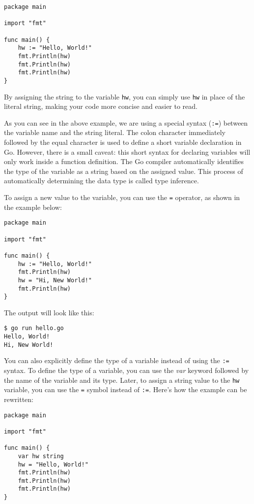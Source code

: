 \begin{lstlisting}
package main

import "fmt"

func main() {
    hw := "Hello, World!"
    fmt.Println(hw)
    fmt.Println(hw)
    fmt.Println(hw)
}
\end{lstlisting}

By assigning the string to the variable \texttt{hw}, you can simply
use \texttt{hw} in place of the literal string, making your code more concise
and easier to read.

As you can see in the above example, we are using a special syntax (\texttt{:=})
between the variable name and the string literal. The colon character
immediately followed by the equal character is used to define a short variable
declaration in Go. However, there is a small caveat: this short syntax for
declaring variables will only work inside a function definition. The Go compiler
automatically identifies the type of the variable as a string based on the
assigned value. This process of automatically determining the data type is
called type inference.

To assign a new value to the variable, you can use the \texttt{=} operator, as
shown in the example below:

\begin{lstlisting}
package main

import "fmt"

func main() {
    hw := "Hello, World!"
    fmt.Println(hw)
    hw = "Hi, New World!"
    fmt.Println(hw)
}
\end{lstlisting}

The output will look like this:

\begin{lstlisting}[numbers=none]
$ go run hello.go
Hello, World!
Hi, New World!
\end{lstlisting}

You can also explicitly define the type of a variable instead of using
the \texttt{:=} syntax. To define the type of a variable, you can use
the \textit{var} keyword followed by the name of the variable and its type.
Later, to assign a string value to the \texttt{hw} variable, you can use
the \texttt{=} symbol instead of \texttt{:=}. Here's how the example can be
rewritten:

\begin{lstlisting}
package main

import "fmt"

func main() {
    var hw string
    hw = "Hello, World!"
    fmt.Println(hw)
    fmt.Println(hw)
    fmt.Println(hw)
}
\end{lstlisting}

